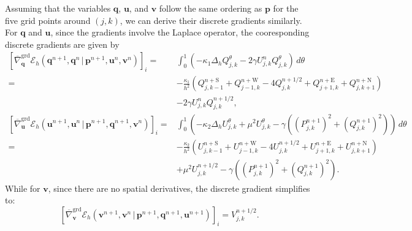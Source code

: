 \documentclass[fleqn,11pt]{elsarticle}
\numberwithin{equation}{section}
\begin{document}
Assuming that the variables $\bm{q}$, $\bm{u}$, and $\bm{v}$ follow the same ordering as $\bm{p}$ for the five grid points around $(j, k)$, we can derive their discrete gradients similarly. For $\bm q$ and $\bm u$, since the gradients involve the Laplace operator, the cooresponding discrete gradients are given by
\[
	\begin{aligned}
		\left[\overline{\nabla}^{\text{grd}}_{\bm q}\mathcal{E}_h(\bm q^{n+1},\bm q^{n}\,\big|\, \bm p^{n+1},\bm u^n,\bm v^n)\right]_{i}
		= & \int_0^1 \left(-\kappa_1 \Delta_h Q_{j,k}^\theta - 2\gamma U_{j,k}^n Q_{j,k}^\theta\right) \, d\theta                                                       \\
		= & -\frac{\kappa_1}{h^2} \left(Q_{j,k-1}^{n+\text{S}} + Q_{j-1, k}^{n+\text{W}} - 4 Q_{j,k}^{n+1/2} + Q_{j+1, k}^{n+\text{E}} + Q_{j, k+1}^{n+\text{N}}\right) \\
		  & - 2\gamma U_{j,k}^n Q_{j,k}^{n+1/2},                                                                                                                        \\
		\left[\overline{\nabla}^{\text{grd}}_{\bm u}\mathcal{E}_h(\bm u^{n+1},\bm u^{n}\,\big|\, \bm p^{n+1},\bm q^{n+1},\bm v^n)\right]_{i}
		= & \int_0^1 \left(-\kappa_2 \Delta_h U_{j,k}^\theta + \mu^2 U_{j,k}^\theta - \gamma \left((P_{j,k}^{n+1})^2 + (Q_{j,k}^{n+1})^2\right)\right) \, d\theta       \\
		= & -\frac{\kappa_2}{h^2} \left(U_{j,k-1}^{n+\text{S}} + U_{j-1, k}^{n+\text{W}} - 4 U_{j,k}^{n+1/2} + U_{j+1, k}^{n+\text{E}} + U_{j, k+1}^{n+\text{N}}\right) \\
		  & + \mu^2 U_{j,k}^{n+1/2} - \gamma \left((P_{j,k}^{n+1})^2 + (Q_{j,k}^{n+1})^2\right).
	\end{aligned}
\]
While for $\bm{v}$, since there are no spatial derivatives, the discrete gradient simplifies to:
\[
	\left[\overline{\nabla}^{\text{grd}}_{\bm v}\mathcal{E}_h(\bm v^{n+1},\bm v^{n}\,\big|\, \bm p^{n+1},\bm q^{n+1},\bm u^{n+1})\right]_{i} = V_{j,k}^{n+1/2}.
\]
\end{document}
